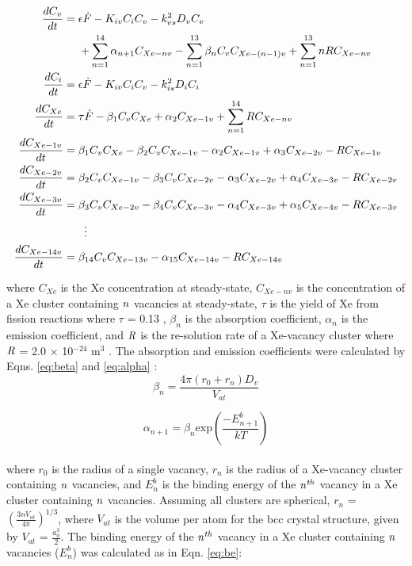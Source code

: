 \documentclass[preprint,12pt]{elsarticle}
\begin{document}
\begin{align} 
\label{eqn:Xe_rate1}
\frac{dC_{v}}{dt}={}&\epsilon\dot{F}- K_{iv}C_{i}C_{v} - k_{vs}^{2}D_{v}C_{v} \\
&+\sum_{n=1}^{14} \alpha_{n+1}C_{Xe-nv} -\sum_{n=1}^{13} \beta_{n}C_{v}C_{Xe-(n-1)v} + \sum_{n=1}^{13} nRC_{Xe-nv}\notag\\
\
\label{eqn:Xe_rate2}
\frac{dC_{i}}{dt}={}&\epsilon\dot{F} - K_{iv}C_{i}C_{v} - k_{is}^{2}D_{i}C_{i} 
\\
\label{eqn:Xe_rate3}
\frac{dC_{Xe}}{dt}={}&\tau\dot{F} - \beta_{1}C_{v}C_{Xe} + \alpha_{2}C_{Xe-1v} + \sum_{n=1}^{14} RC_{Xe-nv}\\
\label{eqn:Xe_rate4}
\frac{dC_{Xe-1v}}{dt}={}&\beta_{1}C_{v}C_{Xe} - \beta_{2}C_{v}C_{Xe-1v} - \alpha_{2}C_{Xe-1v} + \alpha_{3}C_{Xe-2v} - RC_{Xe-1v}
\\
\label{eqn:Xe_rate5}
\frac{dC_{Xe-2v}}{dt}={}& \beta_{2}C_{v}C_{Xe-1v} - \beta_{3}C_{v}C_{Xe-2v} - \alpha_{3}C_{Xe-2v} + \alpha_{4}C_{Xe-3v} - RC_{Xe-2v} 
\\
\label{eqn:Xe_rate6}
\frac{dC_{Xe-3v}}{dt}={}& \beta_{3}C_{v}C_{Xe-2v} - \beta_{4}C_{v}C_{Xe-3v} - \alpha_{4}C_{Xe-3v} + \alpha_{5}C_{Xe-4v} - RC_{Xe-3v}
\\
&\vdotswithin{=} \notag \\
\label{eqn:Xe_rate7}
\frac{dC_{Xe-14v}}{dt}={}& \beta_{14}C_{v}C_{Xe-13v} - \alpha_{15}C_{Xe-14v} - RC_{Xe-14v}
\end{align}

\noindent where $C_{Xe}$ is the Xe concentration at steady-state, $C_{Xe-nv}$ is the concentration of a Xe cluster containing $\it{n}$ vacancies at steady-state, $\tau$ is the yield of Xe from fission reactions where $\tau$ = 0.13 \cite{nichols2008handbook}, $\beta_{n}$ is the absorption coefficient, $\alpha_{n}$ is the emission coefficient, and $\it{R}$ is the re-solution rate of a Xe-vacancy cluster where $\it{R}$ = 2.0 $\times$ 10$^{-24}$ m$^{3}$ \cite{beeler2021microstructural}. The absorption and emission coefficients were calculated by Eqns. \ref{eq:beta} and \ref{eq:alpha} \cite{bai2017modeling}:\\

\begin{equation}
\label{eq:beta}
\beta_{n} = \frac{4\pi(r_{0}+r_{n})D_{v}}{V_{at}}
\end{equation}

\begin{equation}
\label{eq:alpha}
\alpha_{n+1} = \beta_{n}\textrm{exp}(\frac{-E_{n+1}^{b}}{kT})
\end{equation}
\\
\noindent where $r_{0}$ is the radius of a single vacancy, $r_{n}$ is the radius of a Xe-vacancy cluster containing $\it{n}$ vacancies, and $E_{n}^{b}$ is the binding energy of the $\it{n}^{th}$ vacancy in a Xe cluster containing $\it{n}$ vacancies. Assuming all clusters are spherical, $r_{n}$ = $(\frac{3nV_{at}}{4\pi})^{1/3}$, where $V_{at}$ is the volume per atom for the bcc crystal structure, given by $V_{at}$ = $\frac{a_{0}^3}{2}$. The binding energy of the $\it{n}^{th}$ vacancy in a Xe cluster containing $\it{n}$ vacancies ($E^{b}_{n}$) was calculated as in Eqn. \ref{eq:be}:\\
\end{document}
